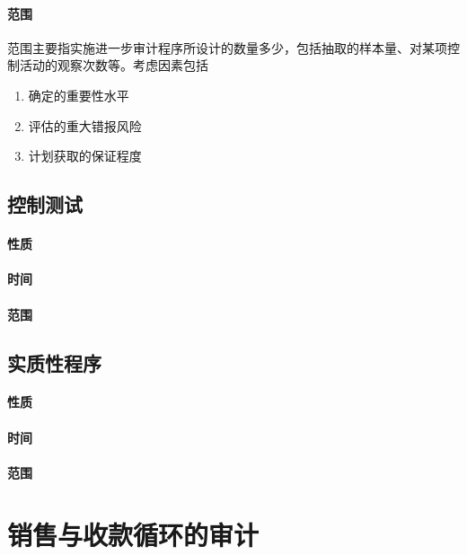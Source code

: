 \documentclass[UTF8,12pt]{ctexart}
\numberwithin{equation}{section} %
\numberwithin{figure}{section}
\numberwithin{table}{section}
\begin{document}
	\paragraph{范围}
	范围主要指实施进一步审计程序所设计的数量多少，包括抽取的样本量、对某项控制活动的观察次数等。考虑因素包括
	\begin{enumerate}
		\item 确定的重要性水平
		
		\item 评估的重大错报风险
		
		\item 计划获取的保证程度
	\end{enumerate}
	
	\subsection{控制测试}
	
	\paragraph{性质}
	
	\paragraph{时间}
	
	\paragraph{范围}
	
	\subsection{实质性程序}
	
	\paragraph{性质}
	
	\paragraph{时间}
	
	\paragraph{范围}
	
	\newpage
	\section{销售与收款循环的审计}
	
\end{document}
